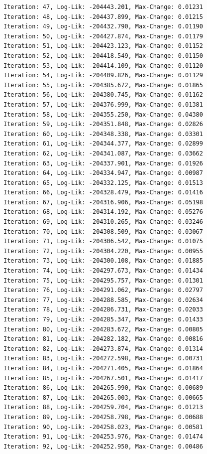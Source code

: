 \documentclass[
  letterpaper,
  DIV=11,
  numbers=noendperiod]{scrreport}
\begin{document}
\begin{verbatim}
Iteration: 47, Log-Lik: -204443.201, Max-Change: 0.01231
Iteration: 48, Log-Lik: -204437.899, Max-Change: 0.01215
Iteration: 49, Log-Lik: -204432.790, Max-Change: 0.01190
Iteration: 50, Log-Lik: -204427.874, Max-Change: 0.01179
Iteration: 51, Log-Lik: -204423.123, Max-Change: 0.01152
Iteration: 52, Log-Lik: -204418.549, Max-Change: 0.01150
Iteration: 53, Log-Lik: -204414.109, Max-Change: 0.01120
Iteration: 54, Log-Lik: -204409.826, Max-Change: 0.01129
Iteration: 55, Log-Lik: -204385.672, Max-Change: 0.01865
Iteration: 56, Log-Lik: -204380.745, Max-Change: 0.01162
Iteration: 57, Log-Lik: -204376.999, Max-Change: 0.01381
Iteration: 58, Log-Lik: -204355.250, Max-Change: 0.04380
Iteration: 59, Log-Lik: -204351.848, Max-Change: 0.02826
Iteration: 60, Log-Lik: -204348.338, Max-Change: 0.03301
Iteration: 61, Log-Lik: -204344.377, Max-Change: 0.02899
Iteration: 62, Log-Lik: -204341.087, Max-Change: 0.03662
Iteration: 63, Log-Lik: -204337.901, Max-Change: 0.01926
Iteration: 64, Log-Lik: -204334.947, Max-Change: 0.00987
Iteration: 65, Log-Lik: -204332.125, Max-Change: 0.01513
Iteration: 66, Log-Lik: -204328.479, Max-Change: 0.01416
Iteration: 67, Log-Lik: -204316.906, Max-Change: 0.05198
Iteration: 68, Log-Lik: -204314.192, Max-Change: 0.05276
Iteration: 69, Log-Lik: -204310.265, Max-Change: 0.03246
Iteration: 70, Log-Lik: -204308.509, Max-Change: 0.03067
Iteration: 71, Log-Lik: -204306.542, Max-Change: 0.01075
Iteration: 72, Log-Lik: -204304.220, Max-Change: 0.00955
Iteration: 73, Log-Lik: -204300.108, Max-Change: 0.01885
Iteration: 74, Log-Lik: -204297.673, Max-Change: 0.01434
Iteration: 75, Log-Lik: -204295.757, Max-Change: 0.01301
Iteration: 76, Log-Lik: -204291.062, Max-Change: 0.02797
Iteration: 77, Log-Lik: -204288.585, Max-Change: 0.02634
Iteration: 78, Log-Lik: -204286.731, Max-Change: 0.02033
Iteration: 79, Log-Lik: -204285.347, Max-Change: 0.01433
Iteration: 80, Log-Lik: -204283.672, Max-Change: 0.00805
Iteration: 81, Log-Lik: -204282.182, Max-Change: 0.00816
Iteration: 82, Log-Lik: -204273.874, Max-Change: 0.01314
Iteration: 83, Log-Lik: -204272.598, Max-Change: 0.00731
Iteration: 84, Log-Lik: -204271.405, Max-Change: 0.01864
Iteration: 85, Log-Lik: -204267.501, Max-Change: 0.01417
Iteration: 86, Log-Lik: -204265.990, Max-Change: 0.00689
Iteration: 87, Log-Lik: -204265.003, Max-Change: 0.00665
Iteration: 88, Log-Lik: -204259.704, Max-Change: 0.01213
Iteration: 89, Log-Lik: -204258.798, Max-Change: 0.00688
Iteration: 90, Log-Lik: -204258.023, Max-Change: 0.00581
Iteration: 91, Log-Lik: -204253.976, Max-Change: 0.01474
Iteration: 92, Log-Lik: -204252.950, Max-Change: 0.00486

\end{verbatim}
\end{document}
